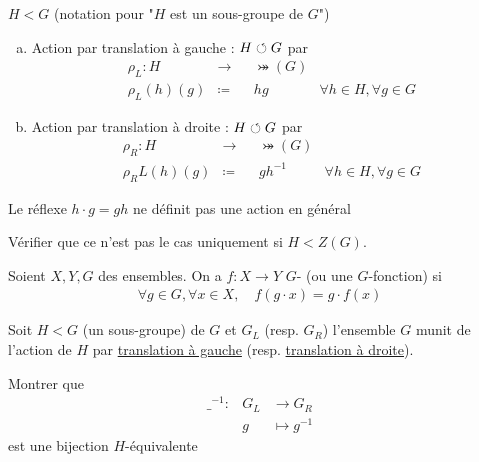 \documentclass[french,a4paper,10pt]{article}
\begin{document}
	
	\begin{example}
		$H<G$ (notation pour "$H$ est un sous-groupe de $G$")
		\begin{enumerate}[(a)]
			\item 
			Action par translation à gauche : $H\circlearrowleft G$ par
			\[\begin{aligned}
				\rho_L\colon H&\to&&\bij(G)\\
				\rho_L(h)(g)&\coloneq& &hg&\forall h\in H, \forall g\in G
			\end{aligned}\]
			
			\item 
			Action par translation à droite : $H\circlearrowleft G$ par
			\[\begin{aligned}
				\rho_R\colon H&\to&&\bij(G)\\
				\rho_RL(h)(g)&\coloneq& &gh^{-1}&\forall h\in H, \forall g\in G
			\end{aligned}\]
			
		\end{enumerate}
		\begin{remark}
			Le réflexe $h\cdot g = gh$ ne définit pas une action en général
			\begin{exercice}
				Vérifier que ce n'est pas le cas uniquement si $H<Z(G)$.
			\end{exercice}
		\end{remark}
	\end{example}
	\begin{definition}
		Soient $X, Y, G$ des ensembles. On a $f\colon X\to Y$ $G$- (ou une $G$-fonction) si
			\[\begin{aligned}
				\forall g\in G,\forall x\in X,\quad f(g\cdot x)=g\cdot f(x)
			\end{aligned}\]
	\end{definition}
	\begin{exercice}
		Soit $H<G$ (un sous-groupe) de $G$ et \color{astral}\underline{\color{black}$G_L$}\color{black} (resp. \color{verdant}\underline{\color{black}$G_R$}\color{black}) l'ensemble $G$ munit de l'action de $H$ par \color{astral}\underline{\color{black}translation à gauche}\color{black} (resp. \color{verdant}\underline{\color{black}translation à droite}\color{black}).
		
		Montrer que
			\[\begin{aligned}
				{\_}^{-1}\colon&G_L&\to G_R\\
				&g&\mapsto g^{-1}
			\end{aligned}\]
		est une bijection $H$-équivalente
	\end{exercice}
\end{document}
